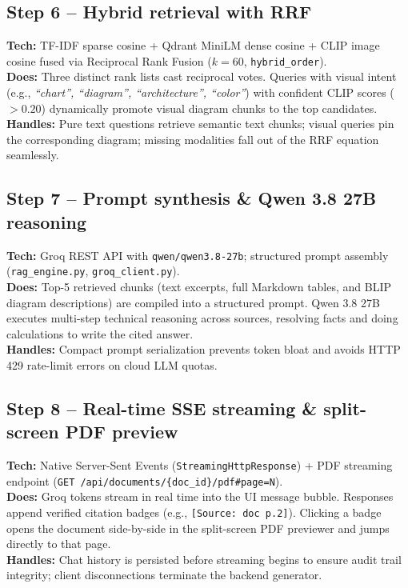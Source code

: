 \documentclass[11pt,a4paper]{article}
\begin{document}
\subsection{Step 6 -- Hybrid retrieval with RRF}
\textbf{Tech:} TF-IDF sparse cosine + Qdrant MiniLM dense cosine + CLIP image cosine fused via Reciprocal Rank Fusion ($k=60$, \texttt{hybrid\_order}).\\
\textbf{Does:} Three distinct rank lists cast reciprocal votes. Queries with visual intent (e.g., \emph{``chart'', ``diagram'', ``architecture'', ``color''}) with confident CLIP scores ($>0.20$) dynamically promote visual diagram chunks to the top candidates.\\
\textbf{Handles:} Pure text questions retrieve semantic text chunks; visual queries pin the corresponding diagram; missing modalities fall out of the RRF equation seamlessly.

\subsection{Step 7 -- Prompt synthesis \& Qwen 3.8 27B reasoning}
\textbf{Tech:} Groq REST API with \texttt{qwen/qwen3.8-27b}; structured prompt assembly (\texttt{rag\_engine.py}, \texttt{groq\_client.py}).\\
\textbf{Does:} Top-5 retrieved chunks (text excerpts, full Markdown tables, and BLIP diagram descriptions) are compiled into a structured prompt. Qwen 3.8 27B executes multi-step technical reasoning across sources, resolving facts and doing calculations to write the cited answer.\\
\textbf{Handles:} Compact prompt serialization prevents token bloat and avoids HTTP 429 rate-limit errors on cloud LLM quotas.

\subsection{Step 8 -- Real-time SSE streaming \& split-screen PDF preview}
\textbf{Tech:} Native Server-Sent Events (\texttt{StreamingHttpResponse}) + PDF streaming endpoint (\texttt{GET /api/documents/\{doc\_id\}/pdf\#page=N}).\\
\textbf{Does:} Groq tokens stream in real time into the UI message bubble. Responses append verified citation badges (e.g., \texttt{[Source: doc p.2]}). Clicking a badge opens the document side-by-side in the split-screen PDF previewer and jumps directly to that page.\\
\textbf{Handles:} Chat history is persisted before streaming begins to ensure audit trail integrity; client disconnections terminate the backend generator.
\end{document}
